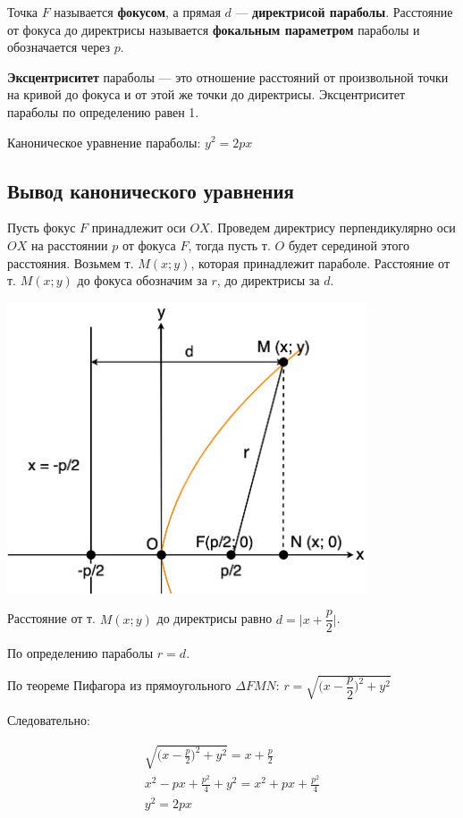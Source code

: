 \documentclass[12pt, fleqn]{extarticle}
\begin{document}
Точка \(F\) называется \textbf{фокусом}, а прямая \(d\) — \textbf{директрисой параболы}.
Расстояние от фокуса до директрисы называется \textbf{фокальным параметром} параболы и обозначается через \(p\).

\textbf{Эксцентриситет} параболы — это отношение расстояний от произвольной точки на кривой до фокуса и от этой же точки до директрисы.
Эксцентриситет параболы по определению равен 1.

Каноническое уравнение параболы: \(y^2 = 2px\)

\subsection*{Вывод канонического уравнения}

Пусть фокус \(F\) принадлежит оси \(OX\).
Проведем директрису перпендикулярно оси \(OX\) на расстоянии \(p\) от фокуса \(F\), тогда пусть т. \(O\) будет серединой этого расстояния.
Возьмем т. \(M(x; y)\), которая принадлежит параболе.
Расстояние от т. \(M(x; y)\) до фокуса обозначим за \(r\), до директрисы за \(d\).

\begin{center}
    \includegraphics[width=0.8\textwidth]{parabola.png}
\end{center}

Расстояние от т. \(M(x;y)\) до директрисы равно \(d = \Big| x + \dfrac{p}{2} \Big| \).

По определению параболы \(r = d\).

По теореме Пифагора из прямоугольного \(\Delta FMN\): \(r=\sqrt{\Big(x - \dfrac{p}{2}\Big)^2 + y^2}\)

Следовательно:

\begin{gather*}
    \sqrt{\Big(x - \frac{p}{2}\Big)^2 + y^2} = x + \frac{p}{2} \\
    x^2 - px + \frac{p^2}{4} + y^2 = x^2 + px + \frac{p^2}{4} \\
    y^2 = 2px
\end{gather*}
\end{document}
